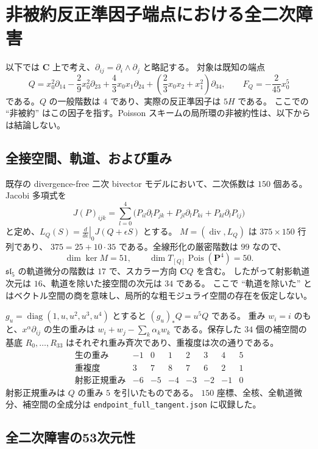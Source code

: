 \section{非被約反正準因子端点における全二次障害}

以下では $\mathbf C$ 上で考え、$\partial_{ij}=\partial_i\wedge\partial_j$ と略記する。
対象は既知の端点
\[
 Q=x_0^2\partial_{14}-\frac29x_0^2\partial_{23}
   +\frac43x_0x_1\partial_{24}
   +\left(\frac23x_0x_2+x_1^2\right)\partial_{34},
 \qquad F_Q=-\frac{2}{45}x_0^5
\]
である。$Q$ の一般階数は $4$ であり、実際の反正準因子は $5H$ である。
ここでの ``非被約'' はこの因子を指す。Poisson スキームの局所環の非被約性は、以下からは結論しない。

\subsection{全接空間、軌道、および重み}

既存の divergence-free 二次 bivector モデルにおいて、二次係数は $150$ 個ある。
Jacobi 多項式を
\[
 J(P)_{ijk}=\sum_{l=0}^4
 \bigl(P_{il}\partial_lP_{jk}+P_{jl}\partial_lP_{ki}+P_{kl}\partial_lP_{ij}\bigr)
\]
と定め、$L_Q(S)=\left.\frac{d}{d\epsilon}\right|_0J(Q+\epsilon S)$ とする。
$M=(\operatorname{div},L_Q)$ は $375\times150$ 行列であり、
$375=25+10\cdot35$ である。全線形化の厳密階数は $99$ なので、
\[
 \dim\ker M=51,\qquad
 \dim T_{[Q]}\operatorname{Pois}(\mathbf P^4)=50.
\]
$\mathfrak{sl}_5$ の軌道微分の階数は $17$ で、スカラー方向 $\mathbf C Q$ を含む。
したがって射影軌道次元は $16$、軌道を除いた接空間の次元は $34$ である。
ここで ``軌道を除いた'' とはベクトル空間の商を意味し、局所的な粗モジュライ空間の存在を仮定しない。

$g_u=\operatorname{diag}(1,u,u^2,u^3,u^4)$ とすると $(g_u)_*Q=u^5Q$ である。
重み $w_i=i$ のもと、$x^\alpha\partial_{ij}$ の生の重みは
$w_i+w_j-\sum_k\alpha_kw_k$ である。保存した $34$ 個の補空間の基底
$R_0,\ldots,R_{33}$ はそれぞれ重み斉次であり、重複度は次の通りである。
\[
\begin{array}{c|rrrrrrr}
\text{生の重み}&-1&0&1&2&3&4&5\\\hline
\text{重複度}&3&7&8&7&6&2&1\\
\text{射影正規重み}&-6&-5&-4&-3&-2&-1&0
\end{array}
\]
射影正規重みは $Q$ の重み $5$ を引いたものである。
$150$ 座標、全核、全軌道微分、補空間の全成分は
\texttt{endpoint\_full\_tangent.json} に収録した。

\subsection{全二次障害の53次元性}

